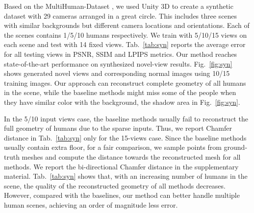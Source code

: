 



Based on the MultiHuman-Dataset \cite{tao2021function4d,zheng2021deepmulticap}, we used Unity 3D to create a synthetic dataset with 29 cameras arranged in a great circle. This includes three scenes with similar backgrounds but different camera locations and orientations. Each of the scenes contains 1/5/10 humans respectively. We train with 5/10/15 views on each scene and test with 14 fixed views. Tab.~\ref{tab:syn} reports the average error for all testing views in PSNR, SSIM and LPIPS metrics. Our method reaches state-of-the-art performance on synthesized novel-view results. Fig.~\ref{fig:syn}  shows generated novel views and corresponding normal images using 10/15 training images. Our approach can reconstruct complete geometry of all humans in the scene, while the baseline methods might miss some of the people when they have similar color with the background, \eg the shadow area in Fig.~\ref{fig:syn}. 

In the 5/10 input views case, the baseline methods usually fail to reconstruct the full geometry of humans due to the sparse inputs. Thus, we report Chamfer distance in Tab.~\ref{tab:syn} only for the 15-views case. Since the baseline methods usually contain extra floor, for a fair comparison, we sample points from ground-truth meshes and compute the distance towards the reconstructed mesh for all methods. We report the bi-directional Chamfer distance in the supplementary material. Tab.~\ref{tab:syn} shows that, with an increasing number of humans in the scene, the quality of the reconstructed geometry of all methods decreases. However, compared with the baselines, our method can better handle multiple human scenes, achieving an order of magnitude less error. 


